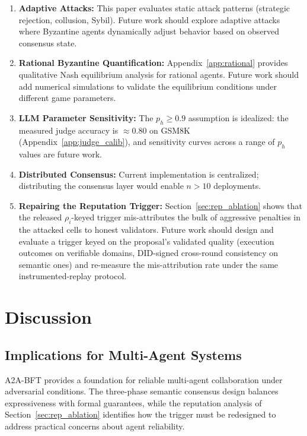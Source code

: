 \documentclass{article}
\begin{document}
\begin{enumerate}
    \item \textbf{Adaptive Attacks:} This paper evaluates static attack patterns (strategic rejection, collusion, Sybil). Future work should explore adaptive attacks where Byzantine agents dynamically adjust behavior based on observed consensus state.
    \item \textbf{Rational Byzantine Quantification:} Appendix~\ref{app:rational} provides qualitative Nash equilibrium analysis for rational agents. Future work should add numerical simulations to validate the equilibrium conditions under different game parameters.
    \item \textbf{LLM Parameter Sensitivity:} The $p_h \geq 0.9$ assumption is idealized: the measured judge accuracy is $\approx 0.80$ on GSM8K (Appendix~\ref{app:judge_calib}), and sensitivity curves across a range of $p_h$ values are future work.
    \item \textbf{Distributed Consensus:} Current implementation is centralized; distributing the consensus layer would enable $n > 10$ deployments.
    \item \textbf{Repairing the Reputation Trigger:} Section~\ref{sec:rep_ablation} shows that the released $\rho_i$-keyed trigger mis-attributes the bulk of aggressive penalties in the attacked cells to honest validators. Future work should design and evaluate a trigger keyed on the proposal's validated quality (execution outcomes on verifiable domains, DID-signed cross-round consistency on semantic ones) and re-measure the mis-attribution rate under the same instrumented-replay protocol.
\end{enumerate}

\section{Discussion}\label{sec:discussion}

\subsection{Implications for Multi-Agent Systems}

A2A-BFT provides a foundation for reliable multi-agent collaboration under adversarial conditions. The three-phase semantic consensus design balances expressiveness with formal guarantees, while the reputation analysis of Section~\ref{sec:rep_ablation} identifies how the trigger must be redesigned to address practical concerns about agent reliability.
\end{document}
